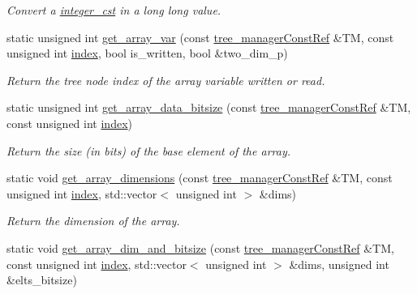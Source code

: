 \begin{DoxyCompactItemize}
\begin{DoxyCompactList}\small\item\em Convert a \hyperlink{structinteger__cst}{integer\+\_\+cst} in a long long value. \end{DoxyCompactList}\item 
static unsigned int \hyperlink{classtree__helper_abbcd4e867eb68219baaea379858277b5}{get\+\_\+array\+\_\+var} (const \hyperlink{tree__manager_8hpp_a792e3f1f892d7d997a8d8a4a12e39346}{tree\+\_\+manager\+Const\+Ref} \&TM, const unsigned int \hyperlink{tutorial__pact__2019_2Introduction_2third_2include_2Keccak_8h_a028c9bdc8344cca38ab522a337074797}{index}, bool is\+\_\+written, bool \&two\+\_\+dim\+\_\+p)
\begin{DoxyCompactList}\small\item\em Return the tree node index of the array variable written or read. \end{DoxyCompactList}\item 
static unsigned int \hyperlink{classtree__helper_a635d8a2cd09d3eb8b3453ee8b608c21a}{get\+\_\+array\+\_\+data\+\_\+bitsize} (const \hyperlink{tree__manager_8hpp_a792e3f1f892d7d997a8d8a4a12e39346}{tree\+\_\+manager\+Const\+Ref} \&TM, const unsigned int \hyperlink{tutorial__pact__2019_2Introduction_2third_2include_2Keccak_8h_a028c9bdc8344cca38ab522a337074797}{index})
\begin{DoxyCompactList}\small\item\em Return the size (in bits) of the base element of the array. \end{DoxyCompactList}\item 
static void \hyperlink{classtree__helper_af8f0e7df9b2a26a0610eeb6b4f7d23e2}{get\+\_\+array\+\_\+dimensions} (const \hyperlink{tree__manager_8hpp_a792e3f1f892d7d997a8d8a4a12e39346}{tree\+\_\+manager\+Const\+Ref} \&TM, const unsigned int \hyperlink{tutorial__pact__2019_2Introduction_2third_2include_2Keccak_8h_a028c9bdc8344cca38ab522a337074797}{index}, std\+::vector$<$ unsigned int $>$ \&dims)
\begin{DoxyCompactList}\small\item\em Return the dimension of the array. \end{DoxyCompactList}\item 
static void \hyperlink{classtree__helper_a6e4f71d1a6990fa830f5a6c2d2d69513}{get\+\_\+array\+\_\+dim\+\_\+and\+\_\+bitsize} (const \hyperlink{tree__manager_8hpp_a792e3f1f892d7d997a8d8a4a12e39346}{tree\+\_\+manager\+Const\+Ref} \&TM, const unsigned int \hyperlink{tutorial__pact__2019_2Introduction_2third_2include_2Keccak_8h_a028c9bdc8344cca38ab522a337074797}{index}, std\+::vector$<$ unsigned int $>$ \&dims, unsigned int \&elts\+\_\+bitsize)

\end{DoxyCompactItemize}
